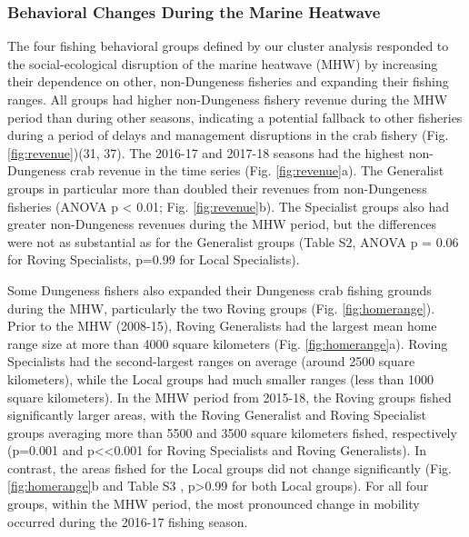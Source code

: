 \documentclass[9pt,twocolumn,twoside,lineno]{pnas-new}
\begin{document}
\hypertarget{behavioral-changes-during-the-marine-heatwave}{%
\subsubsection*{Behavioral Changes During the Marine
Heatwave}\label{behavioral-changes-during-the-marine-heatwave}}

The four fishing behavioral groups defined by our cluster analysis
responded to the social-ecological disruption of the marine heatwave
(MHW) by increasing their dependence on other, non-Dungeness fisheries
and expanding their fishing ranges. All groups had higher non-Dungeness
fishery revenue during the MHW period than during other seasons,
indicating a potential fallback to other fisheries during a period of
delays and management disruptions in the crab fishery (Fig.
\ref{fig:revenue})(31, 37). The 2016-17 and 2017-18 seasons had the
highest non-Dungeness crab revenue in the time series (Fig.
\ref{fig:revenue}a). The Generalist groups in particular more than
doubled their revenues from non-Dungeness fisheries (ANOVA p \textless{}
0.01; Fig. \ref{fig:revenue}b). The Specialist groups also had greater
non-Dungeness revenues during the MHW period, but the differences were
not as substantial as for the Generalist groups (Table S2, ANOVA p =
0.06 for Roving Specialists, p=0.99 for Local Specialists).

Some Dungeness fishers also expanded their Dungeness crab fishing
grounds during the MHW, particularly the two Roving groups (Fig.
\ref{fig:homerange}). Prior to the MHW (2008-15), Roving Generalists had
the largest mean home range size at more than 4000 square kilometers
(Fig. \ref{fig:homerange}a). Roving Specialists had the second-largest
ranges on average (around 2500 square kilometers), while the Local
groups had much smaller ranges (less than 1000 square kilometers). In
the MHW period from 2015-18, the Roving groups fished significantly
larger areas, with the Roving Generalist and Roving Specialist groups
averaging more than 5500 and 3500 square kilometers fished, respectively
(p=0.001 and p\textless\textless0.001 for Roving Specialists and Roving
Generalists). In contrast, the areas fished for the Local groups did not
change significantly (Fig. \ref{fig:homerange}b and Table S3 ,
p\textgreater0.99 for both Local groups). For all four groups, within
the MHW period, the most pronounced change in mobility occurred during
the 2016-17 fishing season.
\end{document}

